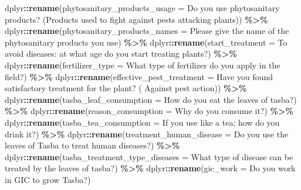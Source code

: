 \documentclass[
]{book}
\newenvironment{Shaded}{\begin{snugshade}}{\end{snugshade}}
\newcommand{\AttributeTok}[1]{\textcolor[rgb]{0.13,0.29,0.53}{#1}}
\newcommand{\FunctionTok}[1]{\textcolor[rgb]{0.13,0.29,0.53}{\textbf{#1}}}
\newcommand{\NormalTok}[1]{#1}
\newcommand{\SpecialCharTok}[1]{\textcolor[rgb]{0.81,0.36,0.00}{\textbf{#1}}}
\newcommand{\StringTok}[1]{\textcolor[rgb]{0.31,0.60,0.02}{#1}}
\begin{document}
\begin{Shaded}
\begin{Highlighting}[]
\NormalTok{  dplyr}\SpecialCharTok{::}\FunctionTok{rename}\NormalTok{(}\AttributeTok{phytosanitary\_products\_usage =} \StringTok{\textasciigrave{}}\AttributeTok{Do you use phytosanitary products? (Products used to fight against pests attacking plants)}\StringTok{\textasciigrave{}}\NormalTok{) }\SpecialCharTok{\%\textgreater{}\%}
\NormalTok{  dplyr}\SpecialCharTok{::}\FunctionTok{rename}\NormalTok{(}\AttributeTok{phytosanitary\_products\_names =} \StringTok{\textasciigrave{}}\AttributeTok{Please give the name of the phytosanitary products you use}\StringTok{\textasciigrave{}}\NormalTok{) }\SpecialCharTok{\%\textgreater{}\%}
\NormalTok{  dplyr}\SpecialCharTok{::}\FunctionTok{rename}\NormalTok{(}\AttributeTok{start\_treatment =} \StringTok{\textasciigrave{}}\AttributeTok{To avoid diseases: at what age do you start treating plants?}\StringTok{\textasciigrave{}}\NormalTok{) }\SpecialCharTok{\%\textgreater{}\%}
\NormalTok{  dplyr}\SpecialCharTok{::}\FunctionTok{rename}\NormalTok{(}\AttributeTok{fertilizer\_type =} \StringTok{\textasciigrave{}}\AttributeTok{What type of fertilizer do you apply in the field?}\StringTok{\textasciigrave{}}\NormalTok{) }\SpecialCharTok{\%\textgreater{}\%}
\NormalTok{  dplyr}\SpecialCharTok{::}\FunctionTok{rename}\NormalTok{(}\AttributeTok{effective\_pest\_treatment =} \StringTok{\textasciigrave{}}\AttributeTok{Have you found satisfactory treatment for the plant? ( Against pest action)}\StringTok{\textasciigrave{}}\NormalTok{) }\SpecialCharTok{\%\textgreater{}\%}
\NormalTok{  dplyr}\SpecialCharTok{::}\FunctionTok{rename}\NormalTok{(}\AttributeTok{tasba\_leaf\_consumption =} \StringTok{\textasciigrave{}}\AttributeTok{How do you eat the leaves of tasba?}\StringTok{\textasciigrave{}}\NormalTok{) }\SpecialCharTok{\%\textgreater{}\%}
\NormalTok{  dplyr}\SpecialCharTok{::}\FunctionTok{rename}\NormalTok{(}\AttributeTok{reason\_consumption =} \StringTok{\textasciigrave{}}\AttributeTok{Why do you consume it?}\StringTok{\textasciigrave{}}\NormalTok{) }\SpecialCharTok{\%\textgreater{}\%}
\NormalTok{  dplyr}\SpecialCharTok{::}\FunctionTok{rename}\NormalTok{(}\AttributeTok{tasba\_tea\_consumption =} \StringTok{\textasciigrave{}}\AttributeTok{If you use like a tea; how do you drink it?}\StringTok{\textasciigrave{}}\NormalTok{) }\SpecialCharTok{\%\textgreater{}\%}
\NormalTok{  dplyr}\SpecialCharTok{::}\FunctionTok{rename}\NormalTok{(}\AttributeTok{treatment\_human\_disease =} \StringTok{\textasciigrave{}}\AttributeTok{Do you use the leaves of Tasba to treat human diseases?}\StringTok{\textasciigrave{}}\NormalTok{) }\SpecialCharTok{\%\textgreater{}\%}
\NormalTok{  dplyr}\SpecialCharTok{::}\FunctionTok{rename}\NormalTok{(}\AttributeTok{tasba\_treatment\_type\_diseases =} \StringTok{\textasciigrave{}}\AttributeTok{What type of disease can be treated by the leaves of tasba?}\StringTok{\textasciigrave{}}\NormalTok{) }\SpecialCharTok{\%\textgreater{}\%}
\NormalTok{  dplyr}\SpecialCharTok{::}\FunctionTok{rename}\NormalTok{(}\AttributeTok{gic\_work =} \StringTok{\textasciigrave{}}\AttributeTok{Do you work in GIC to grow Tasba?}\StringTok{\textasciigrave{}}\NormalTok{)}
\end{Highlighting}
\end{Shaded}
\end{document}
